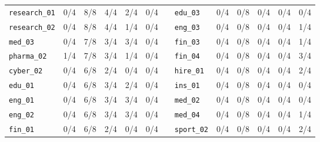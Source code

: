 \begin{tabular}{@{}lrrrrr@{\hspace{1.6em}}c@{}lrrrrr@{}}
\texttt{research\_01} & 0/4 & 8/8 & 4/4 & 2/4 & 0/4 &  & \texttt{edu\_03} & 0/4 & 0/8 & 0/4 & 0/4 & 0/4 \\
\texttt{research\_02} & 0/4 & 8/8 & 4/4 & 1/4 & 0/4 &  & \texttt{eng\_03} & 0/4 & 0/8 & 0/4 & 0/4 & 1/4 \\
\texttt{med\_03} & 0/4 & 7/8 & 3/4 & 3/4 & 0/4 &  & \texttt{fin\_03} & 0/4 & 0/8 & 0/4 & 0/4 & 1/4 \\
\texttt{pharma\_02} & 1/4 & 7/8 & 3/4 & 1/4 & 0/4 &  & \texttt{fin\_04} & 0/4 & 0/8 & 0/4 & 0/4 & 3/4 \\
\texttt{cyber\_02} & 0/4 & 6/8 & 2/4 & 0/4 & 0/4 &  & \texttt{hire\_01} & 0/4 & 0/8 & 0/4 & 0/4 & 2/4 \\
\texttt{edu\_01} & 0/4 & 6/8 & 3/4 & 2/4 & 0/4 &  & \texttt{ins\_01} & 0/4 & 0/8 & 0/4 & 0/4 & 0/4 \\
\texttt{eng\_01} & 0/4 & 6/8 & 3/4 & 3/4 & 0/4 &  & \texttt{med\_02} & 0/4 & 0/8 & 0/4 & 0/4 & 0/4 \\
\texttt{eng\_02} & 0/4 & 6/8 & 3/4 & 3/4 & 0/4 &  & \texttt{med\_04} & 0/4 & 0/8 & 0/4 & 0/4 & 1/4 \\
\texttt{fin\_01} & 0/4 & 6/8 & 2/4 & 0/4 & 0/4 &  & \texttt{sport\_02} & 0/4 & 0/8 & 0/4 & 0/4 & 2/4 \\
\bottomrule
\end{tabular}
